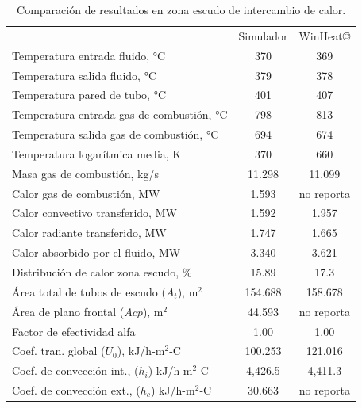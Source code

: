 \begin{table}[H]
\begin{center}
\caption[Resultados en zona escudo de intercambio de calor]{Comparación de resultados en zona escudo de intercambio de calor.}
\label{tbl:compara-ze}
\begin{tabular}{l|c|c}
	& Simulador & WinHeat\copyright \\
Temperatura entrada fluido, °C		& 370 & 369	\\
Temperatura salida fluido, °C		& 379 & 378	\\
Temperatura pared de tubo, °C		& 401 & 407	\\
Temperatura entrada gas de combustión, °C	& 798 & 813	\\
Temperatura salida gas de combustión, °C	& 694 & 674	\\
Temperatura logarítmica media, K	& 370 & 660 \\
Masa gas de combustión, kg/s	    & 11.298 & 11.099	\\

Calor gas de combustión, MW		& 1.593 & no reporta \\
Calor convectivo transferido, MW	& 1.592 & 1.957	\\
Calor radiante transferido, MW		& 1.747 & 1.665	\\
Calor absorbido por el fluido, MW	& 3.340 & 3.621	\\
Distribución de calor zona escudo, \%	& 15.89 &  17.3 \\

Área total de tubos de escudo ($A_t$), m$^2$	& 154.688 & 158.678 \\
Área de plano frontal ($Acp$), m$^2$	& 44.593 & no reporta \\
Factor de efectividad alfa			& 1.00 & 1.00 \\

Coef. tran. global ($U_0$), kJ/h-m$^2$-C	& 100.253  & 121.016 \\
Coef. de convección int., ($h_i$) kJ/h-m$^2$-C	& 4,426.5 & 4,411.3 \\
Coef. de convección ext., ($h_c$) kJ/h-m$^2$-C	& 30.663 & no reporta \\
\end{tabular}
\end{center}
\end{table}

